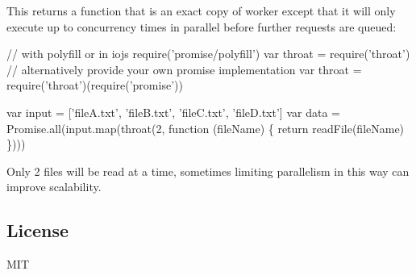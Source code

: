 This returns a function that is an exact copy of {\ttfamily worker} except that it will only execute up to {\ttfamily concurrency} times in parallel before further requests are queued\+:


\begin{DoxyCode}
// with polyfill or in iojs
require('promise/polyfill')
var throat = require('throat')
// alternatively provide your own promise implementation
var throat = require('throat')(require('promise'))

var input = ['fileA.txt', 'fileB.txt', 'fileC.txt', 'fileD.txt']
var data = Promise.all(input.map(throat(2, function (fileName) \{
  return readFile(fileName)
\})))
\end{DoxyCode}


Only 2 files will be read at a time, sometimes limiting parallelism in this way can improve scalability.

\subsection*{License}

M\+IT 